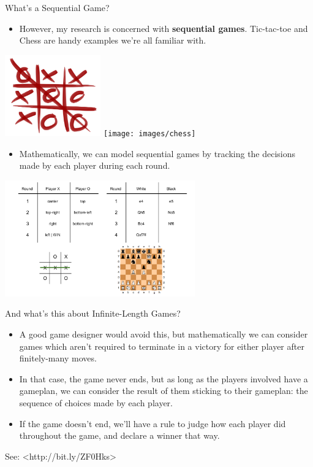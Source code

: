 \documentclass{beamer}
\begin{document}
\begin{frame}{What's a Sequential Game?}
  \begin{itemize}
  \item
    However, my research is concerned with \textbf{sequential games}. Tic-tac-toe and Chess are handy examples we're all familiar with.
  \end{itemize} 
  \begin{center}
    \includegraphics[height=3.5cm]{images/tictactoe}
    \texttt{[image: images/chess]}
  \end{center}
\end{frame}
\begin{frame}
  \begin{itemize}
  \item
    Mathematically, we can model sequential games by tracking the decisions made by each player during each round.
  \end{itemize}
  \begin{center}
    \includegraphics[height=5cm]{images/tictactoe_chess_gameplay}
  \end{center}
\end{frame}

\begin{frame}{And what's this about Infinite-Length Games?}
  \begin{itemize}
  \item
    A good game designer would avoid this, but mathematically we can consider games which aren't required to terminate in a victory for either player after finitely-many moves.
  \pause
  \item
    In that case, the game never ends, but as long as the players involved have a gameplan, we can consider the result of them sticking to their gameplan: the sequence of choices made by each player.
  \pause
  \item
    If the game doesn't end, we'll have a rule to judge how each player did throughout the game, and declare a winner that way.
  \end{itemize}
  {\tiny See: <http://bit.ly/ZF0Hks>}
\end{frame}
\end{document}
